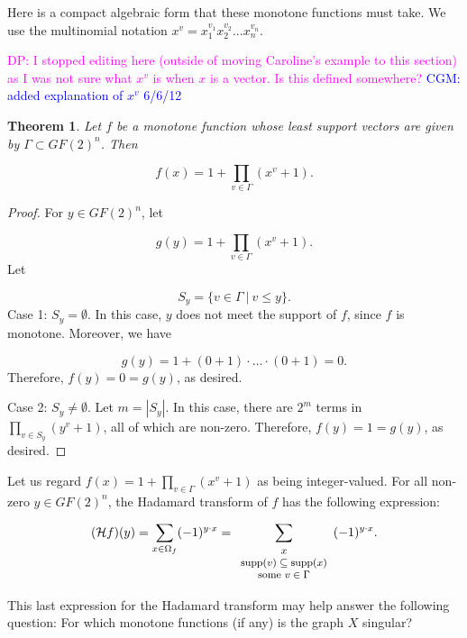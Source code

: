 \documentclass[12pt]{article}
\def\blue#1{\textcolor{blue}{#1}}
\def\magenta#1{\textcolor{magenta}{#1}}
\newcommand{\djp}[1]{\magenta{DP: #1}}
\newcommand{\cgm}[1]{\blue{CGM: #1}}
\newcommand{\djp}[1]{}
\newtheorem{theorem}{Theorem}
\begin{document}
Here is a compact algebraic form that these
monotone functions must take.  We use the multinomial notation 
$x^v=x_1^{v_1}x_2^{v_2}...x_n^{v_n}$.

\djp{I stopped editing here (outside of moving Caroline's example to
  this section) as I was not sure what $x^v$ is when $x$ is a vector.
  Is this defined somewhere?} 
\cgm{added explanation of $x^v$ 6/6/12}

\begin{theorem}
\label{theorem:compact-alg-form}
Let $f$ be a monotone function whose least
support vectors are given by $\Gamma \subset GF(2)^n$.
Then

\[
f(x) = 1+\prod_{v\in\Gamma} (x^v+1).
\]
\end{theorem}

\begin{proof}
For $y \in GF(2)^n$, let

\[
g(y) = 1+\prod_{v\in\Gamma} (x^v+1).
\]
Let

\[
S_y = \{v\in \Gamma \ |\ v\leq y\}.
\]
Case 1: $S_y=\emptyset$. In this case, $y$ does not
meet the support of $f$, since $f$ is monotone. Moreover, we have

\[
g(y)=1+(0+1)\cdot \dots \cdot (0+1)=0.
\]
Therefore, $f(y)=0=g(y)$, as desired.

\noindent
Case 2: $S_y \not=\emptyset$. Let $m = |S_y|$.
In this case, there are $2^m$ terms in
$\prod_{v\in S_y} (y^v+1)$, all of which are non-zero.
Therefore, $f(y)=1=g(y)$, as desired.

\end{proof}

Let us regard ${f}(x) = 1+\prod_{v\in\Gamma} (x^v+1)$
as being integer-valued.  For all non-zero $y \in GF(2)^n$, the
Hadamard transform of $f$ has the following
expression:

\[
({\mathcal{H}}f)(y) =\sum_{x\in \Omega_f}  (-1)^{y \cdot x} =
\sum_{{\footnotesize{
\begin{array}{c}
x \\
{\rm supp}(v) \subseteq {\rm supp}(x) \\
{\rm some}\ v\in  \Gamma
\end{array}
}}}
(-1)^{y \cdot x}.
\]

This last expression for the Hadamard transform may help answer
the following question: For which monotone functions (if any) is the graph
$X$ singular? 
\end{document}
